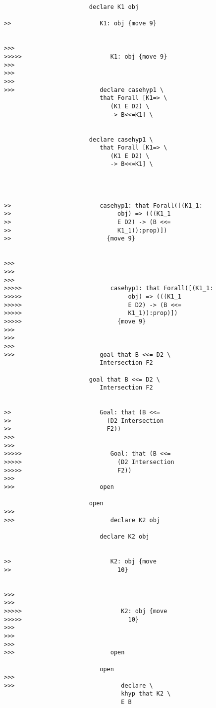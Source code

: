 \documentclass[12pt]{article}
\begin{document}
\begin{verbatim}
                        declare K1 obj

>>                         K1: obj {move 9}


>>>
>>>>>                         K1: obj {move 9}
>>>
>>>
>>>
>>>                        declare casehyp1 \
                           that Forall [K1=> \
                              (K1 E D2) \
                              -> B<<=K1] \
                           

                        declare casehyp1 \
                           that Forall [K1=> \
                              (K1 E D2) \
                              -> B<<=K1] \
                           



>>                         casehyp1: that Forall([(K1_1:
>>                              obj) => (((K1_1
>>                              E D2) -> (B <<=
>>                              K1_1)):prop)])
>>                           {move 9}


>>>
>>>
>>>
>>>>>                         casehyp1: that Forall([(K1_1:
>>>>>                              obj) => (((K1_1
>>>>>                              E D2) -> (B <<=
>>>>>                              K1_1)):prop)])
>>>>>                           {move 9}
>>>
>>>
>>>
>>>                        goal that B <<= D2 \
                           Intersection F2

                        goal that B <<= D2 \
                           Intersection F2


>>                         Goal: that (B <<=
>>                           (D2 Intersection
>>                           F2))
>>>
>>>
>>>>>                         Goal: that (B <<=
>>>>>                           (D2 Intersection
>>>>>                           F2))
>>>
>>>                        open

                        open
>>>
>>>                           declare K2 obj

                           declare K2 obj


>>                            K2: obj {move
>>                              10}


>>>
>>>
>>>>>                            K2: obj {move
>>>>>                              10}
>>>
>>>
>>>
>>>                           open

                           open
>>>
>>>                              declare \
                                 khyp that K2 \
                                 E B


\end{verbatim}
\end{document}
